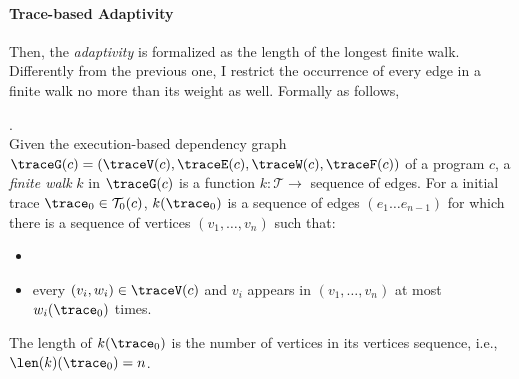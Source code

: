 \paragraph{Trace-based Adaptivity}
Then, the \emph{adaptivity} is formalized as the 
length of the longest finite walk. 
Differently from the previous one, I restrict 
the occurrence of every edge in a finite walk no more than its weight as well. Formally as follows,
\begin{defn}.
  \label{def:finitewalk}
  \\
  Given the execution-based dependency graph $\traceG({c}) = (\traceV({c}), \traceE({c}), \traceW({c}), \traceF({c}))$ of a program $c$,
  a \emph{finite walk} $k$ in $\traceG({c})$ is a 
  function $k: \mathcal{T} \to $ sequence of edges.
  For a initial trace $\trace_0 \in \mathcal{T}_0(c)$, 
  $k(\trace_0)$ is a sequence of edges $(e_1 \ldots e_{n - 1})$ 
  for which there is a sequence of vertices 
  $(v_1, \ldots, v_{n})$ such that:
  \begin{itemize}
      \item {}
      \item every $(v_i, w_i) \in \traceV(c)$
       and $v_i$ appears in $(v_1, \ldots, v_{n})$ at most 
    $w_i(\trace_0)$
      times.  
  \end{itemize}
  The length of $k(\trace_0)$ is the number of vertices in its vertices sequence, i.e., $\len(k)(\trace_0) = n$.
 \end{defn}

